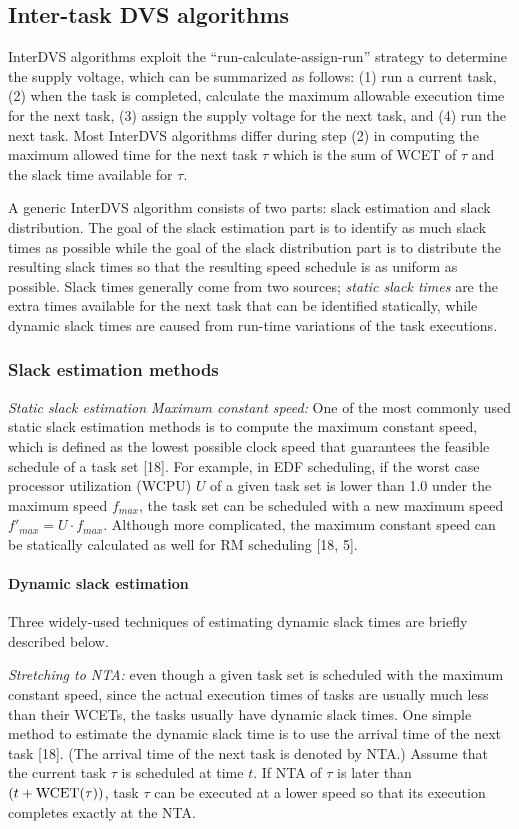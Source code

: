 \documentclass[10pt,article]{IEEEtran}
\begin{document}
\subsection{Inter-task DVS algorithms}
InterDVS algorithms exploit the ``run-calculate-assign-run'' strategy to determine the supply voltage, which can be summarized as follows: (1) run a current task, (2) when the task is completed, calculate the maximum allowable execution time for the next task, (3) assign the supply voltage for the next task, and (4) run the next task.  Most InterDVS algorithms differ during step (2) in computing the maximum allowed time for the next task $\tau$ which is the sum of WCET of $\tau$ and the slack time available for $\tau$.

A generic InterDVS algorithm consists of two parts: slack estimation and slack distribution.  The goal of the slack estimation part is to identify as much slack times as possible while the goal of the slack distribution part is to distribute the resulting slack times so that the resulting speed schedule is as uniform as possible. Slack times generally come from two sources; \emph{static slack times} are the extra times available for the next task that can be identified statically, while {dynamic slack times} are caused from run-time variations of the task executions.

\subsubsection{Slack estimation methods}
\emph{Static slack estimation Maximum constant speed:} One of the most commonly used static slack estimation methods is to compute the maximum constant speed, which is defined as the lowest possible clock speed that guarantees the feasible schedule of a task set [18].  For example, in EDF scheduling, if the worst case  processor utilization (WCPU) $U$ of a given task set is lower than 1.0 under the maximum speed $f_{max}$, the task set can be scheduled with a new maximum speed $f'_{max} = U \cdot f_{max}$. Although more complicated, the maximum constant speed can be statically calculated as well for RM scheduling [18, 5].


\paragraph{Dynamic slack estimation}
Three  widely-used  techniques  of  estimating  dynamic slack times are briefly described below. 

\emph{Stretching to NTA:} even though a given task set  is scheduled with the maximum constant speed, since the actual execution times of tasks are usually much less than their WCETs, the tasks usually have dynamic slack times.  One simple method to estimate the dynamic slack time is to use the  arrival  time  of  the  next  task   [18]. (The  arrival  time of the next task is denoted by NTA.) Assume that the current task $\tau$ is scheduled at time $t$. If NTA of $\tau$ is later than $(t + \textnormal{WCET}(\tau))$, task $\tau$ can be executed at a lower speed so that its execution completes exactly at the NTA. 
\end{document}
